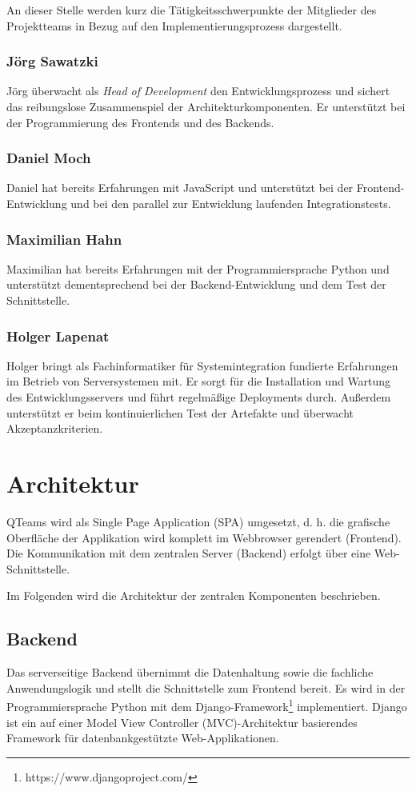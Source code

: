 \documentclass[a4paper,11pt,listof=numbered,glossary=totoc,parskip=half,toc=bib]{scrreprt}
\begin{document}
	An dieser Stelle werden kurz die Tätigkeitsschwerpunkte der Mitglieder des Projektteams in Bezug auf den Implementierungsprozess dargestellt.
	
	\subsubsection{Jörg Sawatzki}
	Jörg überwacht als \textit{Head of Development} den Entwicklungsprozess und sichert das reibungslose Zusammenspiel der Architekturkomponenten. Er unterstützt bei der Programmierung des Frontends und des Backends.
	
	\subsubsection{Daniel Moch}
	Daniel hat bereits Erfahrungen mit JavaScript und unterstützt bei der Frontend-Entwicklung und bei den parallel zur Entwicklung laufenden Integrationstests.
	
	\subsubsection{Maximilian Hahn}
	Maximilian hat bereits Erfahrungen mit der Programmiersprache Python und unterstützt dementsprechend bei der Backend-Entwicklung und dem Test der Schnittstelle.
	
	\subsubsection{Holger Lapenat}
	Holger bringt als Fachinformatiker für Systemintegration fundierte Erfahrungen im Betrieb von Serversystemen mit. Er sorgt für die Installation und Wartung des Entwicklungsservers und führt regelmäßige Deployments durch. Außerdem unterstützt er beim kontinuierlichen Test der Artefakte und überwacht Akzeptanzkriterien.

	
	\section{Architektur}
	\label{sec:architektur}
		QTeams wird als Single Page Application (SPA) umgesetzt, d. h. die grafische Oberfläche der Applikation wird komplett im Webbrowser gerendert (Frontend). Die Kommunikation mit dem zentralen Server (Backend) erfolgt über eine Web-Schnittstelle.
		
		Im Folgenden wird die Architektur der zentralen Komponenten beschrieben.
		
	\subsection{Backend}
	\label{subsec:backend}
	Das serverseitige Backend übernimmt die Datenhaltung sowie die fachliche Anwendungslogik und stellt die Schnittstelle zum Frontend bereit. Es wird in der Programmiersprache Python mit dem Django-Framework\footnote{https://www.djangoproject.com/} implementiert. Django ist ein auf einer \frqq{}Model View Controller (MVC)\flqq{}-Architektur basierendes Framework für datenbankgestützte Web-Applikationen.
	
\end{document}
